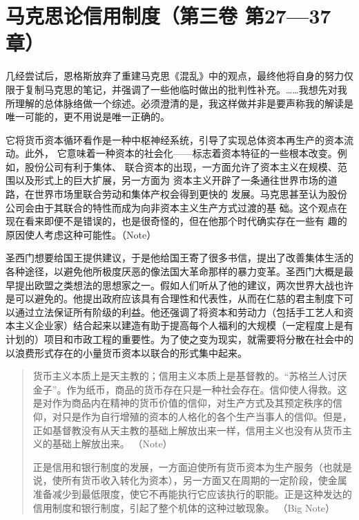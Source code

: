 \chapter{马克思论信用制度（第三卷 第27—37章）}

几经尝试后，恩格斯放弃了重建马克思《混乱》中的观点，最终他将自身的努力仅限于复制马克思的笔记，并强调了一些他临时做出的批判性补充。……我想先对我所理解的总体脉络做一个综述。必须澄清的是，我这样做并非是要声称我的解读是唯一可能的，更不用说是唯一正确的。

它将货币资本循环看作是一种中枢神经系统，引导了实现总体资本再生产的资本流动。此外，
它意味着一种资本的社会化——标志着资本特征的一些根本改变。例如，股份公司有利于集体、
联合资本的出现，一方面允许了资本主义在规模、范围以及形式上的巨大扩展，另一方面为
资本主义开辟了一条通往世界市场的道路，在世界市场里联合劳动和集体产权会得到更快的
发展。马克思甚至认为股份公司会由于其联合的特性而成为向非资本主义生产方式过渡的基
础。这个观点在现在看来即便不是错误的，也是很奇怪的，但在他那个时代确实存在一些有
趣的原因使人考虑这种可能性。（Note）

圣西门想要给国王提供建议，于是他给国王寄了很多书信，提出了改善集体生活的各种途径，以避免他所极度厌恶的像法国大革命那样的暴力变革。圣西门大概是最早提出欧盟之类想法的思想家之一。假如人们听从了他的建议，两次世界大战也许是可以避免的。他提出政府应该具有合理性和代表性，从而在仁慈的君主制度下可以通过立法保证所有阶级的利益。他还强调了将资本和劳动力（包括手工艺人和资本主义企业家）结合起来以建造有助于提高每个人福利的大规模（一定程度上是有计划的）项目和市政工程的重要性。为了使之变为现实，就需要将分散在社会中的以浪费形式存在的小量货币资本以联合的形式集中起来。

\begin{quotation}
货币主义本质上是天主教的；信用主义本质上是基督教的。“苏格兰人讨厌金子”。作为纸币，商品的货币存在只是一种社会存在。信仰使人得救。这是对作为商品内在精神的货币价值的信仰，对生产方式及其预定秩序的信仰，对只是作为自行增殖的资本的人格化的各个生产当事人的信仰。但是，正如基督教没有从天主教的基础上解放出来一样，信用主义也没有从货币主义的基础上解放出来。 （Note）

正是信用和银行制度的发展，一方面迫使所有货币资本为生产服务（也就是说，使所有货币收入转化为资本），另一方面又在周期的一定阶段，使金属准备减少到最低限度，使它不再能执行它应该执行的职能。正是这种发达的信用制度和银行制度，引起了整个机体的这种过敏现象。 （Big Note）


\end{quotation}

